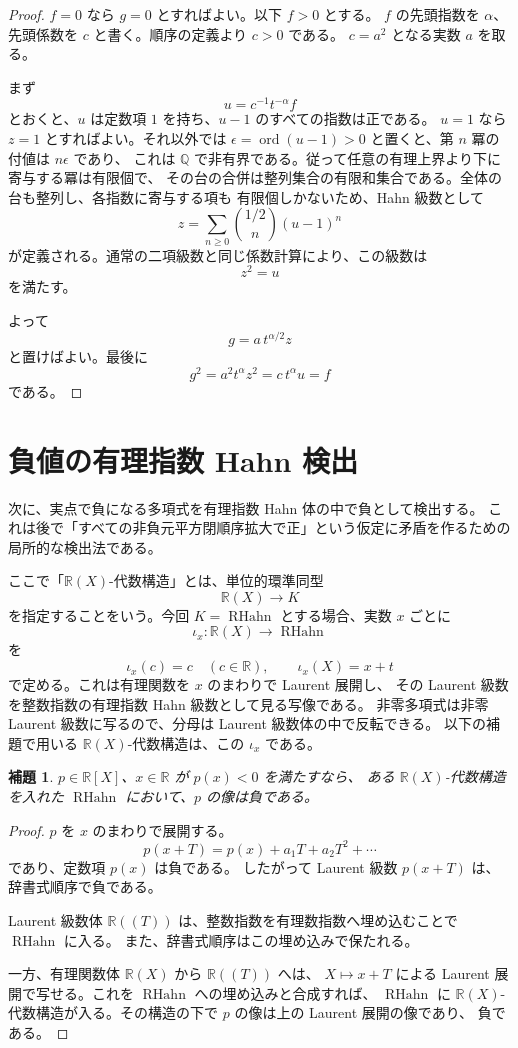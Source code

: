 \documentclass[uplatex,dvipdfmx]{jsarticle}
\newcommand{\Poly}{\mathbb{R}[X]}
\newcommand{\Frac}{\mathbb{R}(X)}
\newcommand{\RationalHahn}{\operatorname{RHahn}}
\newcommand{\ord}{\operatorname{ord}}
\theoremstyle{matrixsosdefinition}
\newtheorem{lemma}[theorem]{補題}
\begin{document}
\begin{proof}
  \(f=0\) なら \(g=0\) とすればよい。以下 \(f>0\) とする。
  \(f\) の先頭指数を \(\alpha\)、先頭係数を \(c\) と書く。順序の定義より \(c>0\) である。
  \(c=a^2\) となる実数 \(a\) を取る。

  まず
  \[
    u=c^{-1}t^{-\alpha}f
  \]
  とおくと、\(u\) は定数項 \(1\) を持ち、\(u-1\) のすべての指数は正である。
  \(u=1\) なら \(z=1\) とすればよい。それ以外では
  \(\epsilon=\ord(u-1)>0\) と置くと、第 \(n\) 冪の付値は \(n\epsilon\) であり、
  これは \(\mathbb Q\) で非有界である。従って任意の有理上界より下に寄与する冪は有限個で、
  その台の合併は整列集合の有限和集合である。全体の台も整列し、各指数に寄与する項も
  有限個しかないため、Hahn 級数として
  \[
    z=\sum_{n\ge0}\binom{1/2}{n}(u-1)^n
  \]
  が定義される。通常の二項級数と同じ係数計算により、この級数は
  \[
    z^2=u
  \]
  を満たす。

  よって
  \[
    g=a\,t^{\alpha/2}z
  \]
  と置けばよい。最後に
  \[
    g^2=a^2t^\alpha z^2=c\,t^\alpha u=f
  \]
  である。
\end{proof}

\section{負値の有理指数 Hahn 検出}

次に、実点で負になる多項式を有理指数 Hahn 体の中で負として検出する。
これは後で「すべての非負元平方閉順序拡大で正」という仮定に矛盾を作るための局所的な検出法である。

ここで「\(\Frac\)-代数構造」とは、単位的環準同型
\[
  \Frac\longrightarrow K
\]
を指定することをいう。今回 \(K=\RationalHahn\) とする場合、実数 \(x\) ごとに
\[
  \iota_x:\Frac\longrightarrow\RationalHahn
\]
を
\[
  \iota_x(c)=c\quad(c\in\mathbb{R}),\qquad
  \iota_x(X)=x+t
\]
で定める。これは有理関数を \(x\) のまわりで Laurent 展開し、
その Laurent 級数を整数指数の有理指数 Hahn 級数として見る写像である。
非零多項式は非零 Laurent 級数に写るので、分母は Laurent 級数体の中で反転できる。
以下の補題で用いる \(\Frac\)-代数構造は、この \(\iota_x\) である。

\begin{lemma}\label{lem:negative-polynomial-hahn}
  \(p\in\Poly\)、\(x\in\mathbb{R}\) が \(p(x)<0\) を満たすなら、
  ある \(\Frac\)-代数構造を入れた \(\RationalHahn\) において、\(p\) の像は負である。
\end{lemma}

\begin{proof}
  \(p\) を \(x\) のまわりで展開する。
  \[
    p(x+T)=p(x)+a_1T+a_2T^2+\cdots
  \]
  であり、定数項 \(p(x)\) は負である。
  したがって Laurent 級数 \(p(x+T)\) は、辞書式順序で負である。

  Laurent 級数体 \(\mathbb{R}((T))\) は、整数指数を有理数指数へ埋め込むことで \(\RationalHahn\) に入る。
  また、辞書式順序はこの埋め込みで保たれる。

  一方、有理関数体 \(\mathbb{R}(X)\) から \(\mathbb{R}((T))\) へは、
  \(X\mapsto x+T\) による Laurent 展開で写せる。これを \(\RationalHahn\) への埋め込みと合成すれば、
  \(\RationalHahn\) に \(\Frac\)-代数構造が入る。その構造の下で \(p\) の像は上の Laurent 展開の像であり、
  負である。
\end{proof}
\end{document}

